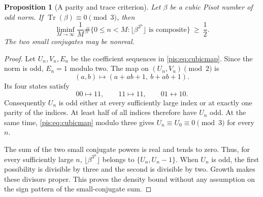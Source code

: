 \documentclass[11pt,a4paper]{article}
\newtheorem{proposition}[theorem]{Proposition}
\theoremstyle{definition}\newtheorem{definition}[theorem]{Definition}
\theoremstyle{remark}\newtheorem{remark}[theorem]{Remark}
\begin{document}
\begin{proposition}[A parity and trace criterion]
\label{pis:local:prop:half}
Let $\beta$ be a cubic Pisot number of odd norm. If
$\operatorname{Tr}(\beta)\equiv0\pmod3$, then
\[
 \liminf_{M\to\infty}\frac{1}{M}
 \#\{0\le n<M:\lfloor\beta^{3^n}\rfloor
                  \text{ is composite}\}\ \ge\ \frac12.
\]
The two small conjugates may be nonreal.
\end{proposition}
\begin{proof}
Let $U_n,V_n,E_n$ be the coefficient sequences in
\eqref{pis:eq:cubicmap}. Since the norm is odd, $E_n=1$ modulo two.
The map on $(U_n,V_n)\pmod2$ is
\[
 (a,b)\longmapsto(a+ab+1,\ b+ab+1).
\]
Its four states satisfy
\[
 00\longmapsto11,\qquad11\longmapsto11,
 \qquad01\longleftrightarrow10.
\]
Consequently $U_n$ is odd either at every sufficiently large index
or at exactly one parity of the indices. At least half of all
indices therefore have $U_n$ odd. At the same time,
\eqref{pis:eq:cubicmap} modulo three gives $U_n\equiv U_0\equiv0\pmod3$
for every $n$.

The sum of the two small conjugate powers is real and tends to zero.
Thus, for every sufficiently large $n$,
$\lfloor\beta^{3^n}\rfloor$ belongs to $\{U_n,U_n-1\}$.
When $U_n$ is odd, the first possibility is divisible by three and
the second is divisible by two. Growth makes these divisors proper.
This proves the density bound without any assumption on the sign
pattern of the small-conjugate sum.
\end{proof}
\end{document}
